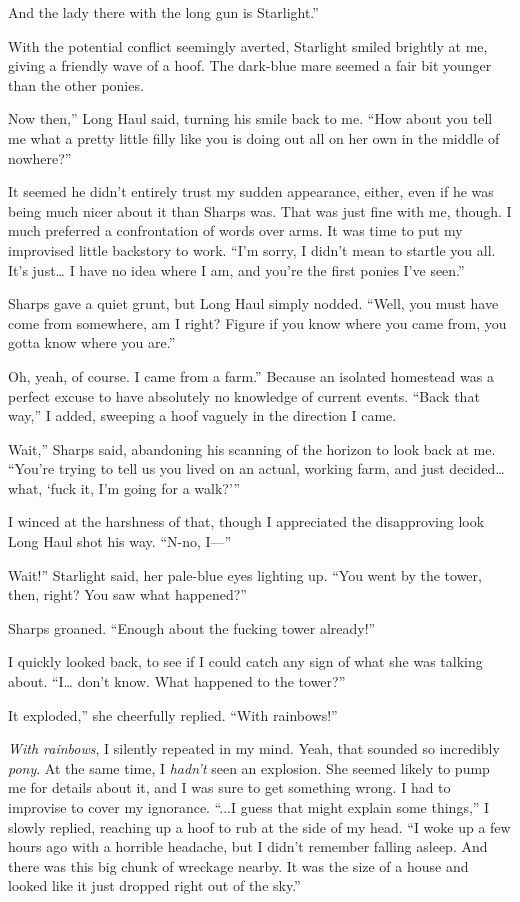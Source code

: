 \leavevmode{}And the lady there with the long gun is Starlight.”

With the potential conflict seemingly averted, Starlight smiled brightly at me, giving a friendly wave of a hoof. The dark-blue mare seemed a fair bit younger than the other ponies.

\leavevmode{}Now then,” Long Haul said, turning his smile back to me. “How about you tell me what a pretty little filly like you is doing out all on her own in the middle of nowhere?”

It seemed he didn’t entirely trust my sudden appearance, either, even if he was being much nicer about it than Sharps was. That was just fine with me, though. I much preferred a confrontation of words over arms. It was time to put my improvised little backstory to work. “I’m sorry, I didn’t mean to startle you all. It’s just… I have no idea where I am, and you’re the first ponies I’ve seen.”

Sharps gave a quiet grunt, but Long Haul simply nodded. “Well, you must have come from somewhere, am I right? Figure if you know where you came from, you gotta know where you are.”

\leavevmode{}Oh, yeah, of course. I came from a farm.” Because an isolated homestead was a perfect excuse to have absolutely no knowledge of current events. “Back that way,” I added, sweeping a hoof vaguely in the direction I came.

\leavevmode{}Wait,” Sharps said, abandoning his scanning of the horizon to look back at me. “You’re trying to tell us you lived on an actual, working farm, and just decided… what, ‘fuck it, I’m going for a walk?’”

I winced at the harshness of that, though I appreciated the disapproving look Long Haul shot his way. “N-no, I—”

\leavevmode{}Wait!” Starlight said, her pale-blue eyes lighting up. “You went by the tower, then, right? You saw what happened?”

Sharps groaned. “Enough about the fucking tower already!”

I quickly looked back, to see if I could catch any sign of what she was talking about. “I… don’t know. What happened to the tower?”

\leavevmode{}It exploded,” she cheerfully replied. “With rainbows!”

\textit{With rainbows}, I silently repeated in my mind. Yeah, that sounded so incredibly \textit{pony}. At the same time, I \textit{hadn’t} seen an explosion. She seemed likely to pump me for details about it, and I was sure to get something wrong. I had to improvise to cover my ignorance. “...I guess that might explain some things,” I slowly replied, reaching up a hoof to rub at the side of my head. “I woke up a few hours ago with a horrible headache, but I didn’t remember falling asleep. And there was this big chunk of wreckage nearby. It was the size of a house and looked like it just dropped right out of the sky.”

